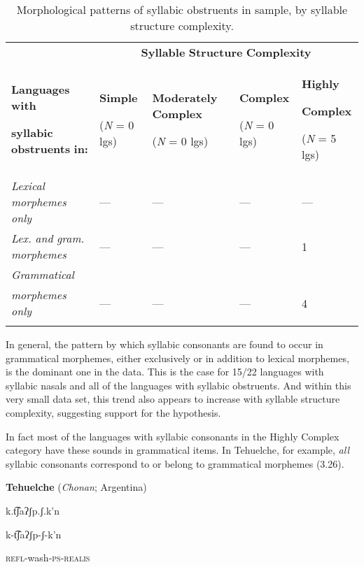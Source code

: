 \begin{table}
\begin{tabularx}{\textwidth}{XXXXX}
 & \multicolumn{4}{c}{ \textbf{Syllable} \textbf{Structure} \textbf{Complexity}}\\
\lsptoprule
{ \textbf{Languages} \textbf{with} }

 \textbf{syllabic} \textbf{obstruents} \textbf{in:} & { \textbf{Simple}}

 (\textit{N} = 0 lgs) & { \textbf{Moderately} \textbf{Complex}}

 (\textit{N} = 0 lgs) & { \textbf{Complex}}

 (\textit{N} = 0 lgs) & { \textbf{Highly} }

{ \textbf{Complex}}

 (\textit{N} = 5 lgs)\\
 \textit{Lexical} \textit{morphemes} \textit{only} & — & — & — & —\\
 \textit{Lex.} \textit{and} \textit{gram.} \textit{morphemes} & — & — & — & 1\\
 \textit{Grammatical} \\
\textit{morphemes} \textit{only} & — & — & — & 4\\
\lspbottomrule
\end{tabularx}
\caption{\label{3.11}Morphological patterns of syllabic obstruents in sample, by syllable structure complexity.}
\end{table}

  In general, the pattern by which syllabic consonants are found to occur in grammatical morphemes, either exclusively or in addition to lexical morphemes, is the dominant one in the data. This is the case for 15/22 languages with syllabic nasals and all of the languages with syllabic obstruents. And within this very small data set, this trend also appears to increase with syllable structure complexity, suggesting support for the hypothesis. 

  In fact most of the languages with syllabic consonants in the Highly Complex category have these sounds in grammatical items. In Tehuelche, for example, \textit{all} syllabic consonants correspond to or belong to grammatical morphemes (3.26).

\ea\label{ex:(3.26)}
   \textbf{Tehuelche} (\textit{Chonan}; Argentina)

k.t͡ʃaʔʃp.ʃ.k’n

k{}-t͡ʃaʔʃp{}-ʃ{}-k’n

\textsc{refl}{}-wash-\textsc{ps-realis}

